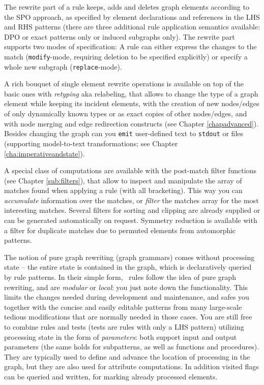 The rewrite part of a rule keeps, adds and deletes graph elements according to the SPO approach, as specified by element declarations and references in the LHS and RHS patterns (there are three additional rule application semantics available: DPO or exact patterns only or induced subgraphs only).
The rewrite part supports two modes of specification: A rule can either express the changes to the match (\texttt{modify}-mode, requiring deletion to be specified explicitly) or specify a whole new subgraph (\texttt{replace}-mode).

A rich bouquet of single element rewrite operations is available on top of the basic ones with \emph{retyping} aka relabeling, that allows to change the type of a graph element while keeping its incident elements, with the creation of new nodes/edges of only dynamically known types or as exact copies of other nodes/edges, and with node merging and edge redirection constructs (see Chapter \ref{chapadvanced}).
Besides changing the graph can you \texttt{emit} user-defined text to \texttt{stdout} or files (supporting model-to-text transformations; see Chapter \ref{cha:imperativeandstate}).

A special class of computations are available with the post-match filter functions (see Chapter \ref{sub:filters}), that allow to inspect and manipulate the array of matches found when applying a rule (with all bracketing). 
This way you can \emph{accumulate} information over the matches, or \emph{filter} the matches array for the most interesting matches.
Several filters for sorting and clipping are already supplied or can be generated automatically on request.
Symmetry reduction is available with a filter for duplicate matches due to permuted elements from automorphic patterns.

The notion of pure graph rewriting (graph grammars) comes without processing state -- the entire state is contained in the graph, which is declaratively queried by rule patterns.
In their simple form, \GrG\ rules follow the idea of pure graph rewriting, and are \emph{modular} or \emph{local}: you just note down the functionality.
This limits the changes needed during development and maintenance, and safes you together with the concise and easily editable patterns from many large-scale tedious modifications that are normally needed in those cases.
You are still free to combine rules and tests (tests are rules with only a LHS pattern) utilizing processing state in the form of \emph{parameters}: both support input and output parameters (the same holds for subpatterns, as well as functions and procedures).
They are typically used to define and advance the location of processing in the graph, but they are also used for attribute computations.
In addition visited flags can be queried and written, for marking already processed elements.

